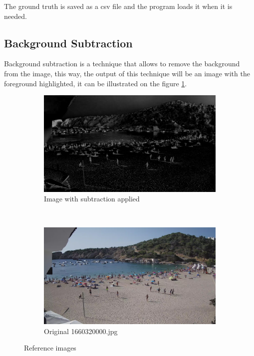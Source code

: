 \documentclass[10pt]{article}
\begin{document}
The ground truth is saved as a csv file and the program loads it when it is needed.

\subsection{Background Subtraction}
Background subtraction is a technique that allows to remove the background from the image, this way, the output of this technique will be an image with the foreground highlighted, it can be illustrated on the figure \ref{fig:sub_side}.

\begin{figure}[h]
  \begin{subfigure}[t]{0.5\textwidth}
    \centering
    \includegraphics[width=\textwidth]{../gen/sub/1660320000.jpg}
    \caption{Image with subtraction applied}
    \label{fig:sub_side}
  \end{subfigure}
  ~
  \begin{subfigure}[t]{0.5\textwidth}
    \centering
    \includegraphics[width=\textwidth]{../Gelabert/1660320000.jpg}
    \caption{Original 1660320000.jpg}
    \label{fig:y equals x}
  \end{subfigure}

  \caption{Reference images}
  \label{fig:img_reference}
\end{figure}
\FloatBarrier
\end{document}
